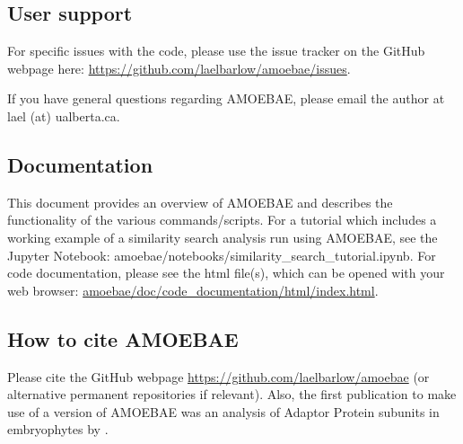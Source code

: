 \documentclass[12pt,letterpaper]{article}
\begin{document}
\begin{linenumbers}
\subsection{User support}

For specific issues with the code, please use the issue tracker on the GitHub
    webpage here: \url{https://github.com/laelbarlow/amoebae/issues}. 

If you have general questions regarding AMOEBAE, please email the author at
    lael (at) ualberta.ca.

\subsection{Documentation}

This document provides an overview of AMOEBAE and describes the functionality
of the various commands/scripts. For a tutorial which includes a working
example of a similarity search analysis run using AMOEBAE, see the Jupyter
Notebook: amoebae/notebooks/similarity\_search\_tutorial.ipynb. For code
documentation, please see the html file(s), which can be opened with your web
browser: \url{amoebae/doc/code_documentation/html/index.html}.

%
%
%
%
%
%


\subsection{How to cite AMOEBAE}

Please cite the GitHub webpage \url{https://github.com/laelbarlow/amoebae} (or
alternative permanent repositories if relevant). Also, the first publication to
make use of a version of AMOEBAE was an analysis of Adaptor Protein subunits in
embryophytes by \cite{larson2019}.


\end{linenumbers}
\end{document}
